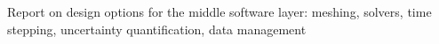 Report on design options for the middle software layer: meshing, solvers, time stepping, uncertainty quantification, data management
